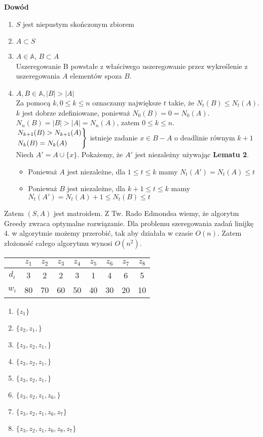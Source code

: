 \textbf{Dowód}
\begin{enumerate}
	\item $S$ jest niepustym skończonym zbiorem
	\item $A \subset S$
	\item $A\in\mathbb{A}$, $B \subset A$ \\
	Uszeregowanie B powstałe z właściwego uszeregowanie przez wykreślenie z uszeregowania $A$ elementów spoza $B$.
	\item $A,B \in \mathbb{A}, |B| > |A|$ \\
	Za pomocą $k, 0\leq k \leq n$ oznaczamy największe $t$ takie, że $N_t(B) \leq N_t(A)$. $k$ jest dobrze zdefiniowane, ponieważ $N_0(B) = 0 = N_0(A)$. $N_n(B) = |B| >  |A| = N_n(A)$, zatem  $0\leq k \leq n$. \\
$\begin{drcases}
	N_{k+1}(B) > N_{k+1}(A) \\
	N_k(B) = N_k(A)
\end{drcases}$ istnieje zadanie $x \in B - A$ o deadlinie równym $k+1$
Niech $A' = A \cup \{x\}$. Pokażemy, że $A'$ jest niezależny używając \textbf{Lematu 2}. 
\begin{itemize}
	\item Ponieważ $A$ jest niezależne, dla $1 \leq t \leq k$ mamy $N_t(A') = N_t(A) \leq t$
	\item Ponieważ $B$ jest niezależne, dla $k+1 \leq t \leq k$ mamy $N_t(A') = N_t(A)+1 \leq N_t(B) \leq t$
\end{itemize}
\end{enumerate}
Zatem $(S,A)$ jest matroidem. Z Tw. Rado Edmondsa wiemy, że algorytm Greedy zwraca optymalne rozwiązanie. Dla problemu szeregowania zadań linijkę 4. w algorytmie możemy przerobić, tak aby działała w czasie $O(n)$. Zatem złożoność całego algorytmu wynosi $O(n^2)$.

\begin{center}
\begin{tabular}{ c | c | c | c | c | c | c | c | c } 
  	 	& $z_1$	& $z_2$ & $z_3$ & $z_4$	& $z_5$	& $z_6$ & $z_7$ & $z_8$	\\ \hline
  $d_i$	& 3		& 2		& 2		& 3		& 1		& 4		& 6		& 5		\\ \hline
  $w_i$	& 80	& 70	& 60	& 50	& 40	& 30	& 20	& 10	\\ 
\end{tabular}
\end{center}
\begin{enumerate}
	\item $\{ z_1 \}$
	\item $\{ z_2, z_1, \}$
	\item $\{ z_3, z_2, z_1, \}$
	\item $\{ z_3, z_2, z_1, \}$
	\item $\{ z_3, z_2, z_1, \}$
	\item $\{ z_3, z_2, z_1, z_6, \}$
	\item $\{ z_3, z_2, z_1, z_6, z_7 \}$
	\item $\{ z_3, z_2, z_1, z_6, z_8, z_7 \}$
\end{enumerate}

